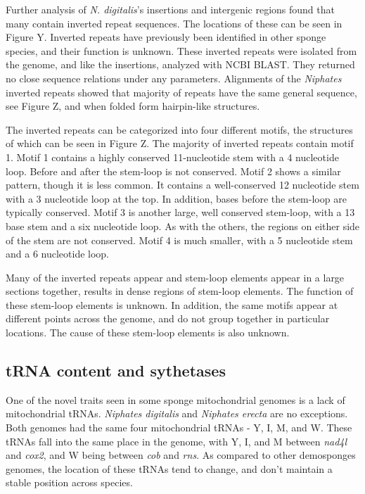 \documentclass[../main.tex]{subfiles}
\begin{document}
Further analysis of \emph{N. digitalis}'s insertions and intergenic regions found that many contain inverted repeat sequences. The locations of these can be seen in Figure Y. Inverted repeats have previously been identified in other sponge species, and their function is unknown. These inverted repeats were isolated from the genome, and like the insertions, analyzed with NCBI BLAST. They returned no close sequence relations under any parameters. Alignments of the \emph{Niphates} inverted repeats showed that majority of repeats have the same general sequence, see Figure Z, and when folded form hairpin-like structures.

The inverted repeats can be categorized into four different motifs, the structures of which can be seen in Figure Z. The majority of inverted repeats contain motif 1. Motif 1 contains a highly conserved 11-nucleotide stem with a 4 nucleotide loop. Before and after the stem-loop is not conserved. Motif 2 shows a similar pattern, though it is less common. It contains a well-conserved 12 nucleotide stem with a 3 nucleotide loop at the top. In addition, bases before the stem-loop are typically conserved. Motif 3 is another large, well conserved stem-loop, with a 13 base stem and a six nucleotide loop. As with the others, the regions on either side of the stem are not conserved. Motif 4 is much smaller, with a 5 nucleotide stem and a 6 nucleotide loop. 

Many of the inverted repeats appear and stem-loop elements appear in a large sections together, results in dense regions of stem-loop elements. The function of these stem-loop elements is unknown. In addition, the same motifs appear at different points across the genome, and do not group together in particular locations. The cause of these stem-loop elements is also unknown.

\subsection{tRNA content and sythetases}
One of the novel traits seen in some sponge mitochondrial genomes is a lack of mitochondrial tRNAs. \emph{Niphates digitalis} and \emph{Niphates erecta} are no exceptions. Both genomes had the same four mitochondrial tRNAs - Y, I, M, and W. These tRNAs fall into the same place in the genome, with Y, I, and M between \emph{nad4l} and \emph{cox2}, and W being between \emph{cob} and \emph{rns}. As compared to other demosponges genomes, the location of these tRNAs tend to change, and don't maintain a stable position across species.
\end{document}
